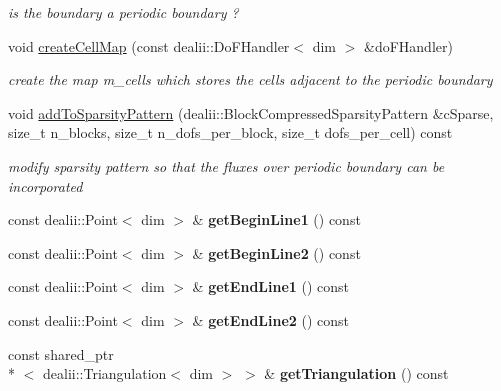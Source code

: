\begin{DoxyCompactItemize}
\begin{DoxyCompactList}\small\item\em is the boundary a periodic boundary ? \end{DoxyCompactList}\item 
void \hyperlink{classnatrium_1_1PeriodicBoundary_a233d460baa307b13bc32efb57c07f7c5}{create\-Cell\-Map} (const dealii\-::\-Do\-F\-Handler$<$ dim $>$ \&do\-F\-Handler)
\begin{DoxyCompactList}\small\item\em create the map m\-\_\-cells which stores the cells adjacent to the periodic boundary \end{DoxyCompactList}\item 
void \hyperlink{classnatrium_1_1PeriodicBoundary_a64bf40dba8fb5af766388e368a9ce2a1}{add\-To\-Sparsity\-Pattern} (dealii\-::\-Block\-Compressed\-Sparsity\-Pattern \&c\-Sparse, size\-\_\-t n\-\_\-blocks, size\-\_\-t n\-\_\-dofs\-\_\-per\-\_\-block, size\-\_\-t dofs\-\_\-per\-\_\-cell) const 
\begin{DoxyCompactList}\small\item\em modify sparsity pattern so that the fluxes over periodic boundary can be incorporated \end{DoxyCompactList}\item 
\hypertarget{classnatrium_1_1PeriodicBoundary_a65ae8204075b82c9bec0c3228a1a64b4}{const dealii\-::\-Point$<$ dim $>$ \& {\bfseries get\-Begin\-Line1} () const }\label{classnatrium_1_1PeriodicBoundary_a65ae8204075b82c9bec0c3228a1a64b4}

\item 
\hypertarget{classnatrium_1_1PeriodicBoundary_a4df4b764f1e5e083d783cca4d47e6f4e}{const dealii\-::\-Point$<$ dim $>$ \& {\bfseries get\-Begin\-Line2} () const }\label{classnatrium_1_1PeriodicBoundary_a4df4b764f1e5e083d783cca4d47e6f4e}

\item 
\hypertarget{classnatrium_1_1PeriodicBoundary_ab3b83fa783008a541163e2f5c88c6559}{const dealii\-::\-Point$<$ dim $>$ \& {\bfseries get\-End\-Line1} () const }\label{classnatrium_1_1PeriodicBoundary_ab3b83fa783008a541163e2f5c88c6559}

\item 
\hypertarget{classnatrium_1_1PeriodicBoundary_a882ea84b3f9a6367f295f8236cd75686}{const dealii\-::\-Point$<$ dim $>$ \& {\bfseries get\-End\-Line2} () const }\label{classnatrium_1_1PeriodicBoundary_a882ea84b3f9a6367f295f8236cd75686}

\item 
\hypertarget{classnatrium_1_1PeriodicBoundary_a5754ea62416bc8c1149c059f3b05d5ad}{const shared\-\_\-ptr\\*
$<$ dealii\-::\-Triangulation$<$ dim $>$ $>$ \& {\bfseries get\-Triangulation} () const }\label{classnatrium_1_1PeriodicBoundary_a5754ea62416bc8c1149c059f3b05d5ad}


\end{DoxyCompactItemize}
